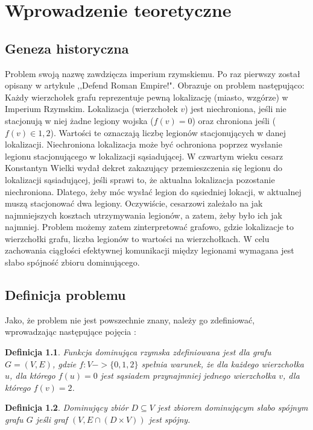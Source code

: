 \chapter{Wprowadzenie teoretyczne}

\section{Geneza historyczna}
Problem swoją nazwę zawdzięcza imperium rzymskiemu. Po raz pierwszy został opisany w artykule ,,Defend Roman Empire!".\cite{defendRomanEmpire}
Obrazuje on problem następująco: Każdy wierzchołek grafu reprezentuje pewną lokalizację (miasto, wzgórze) w Imperium Rzymskim. Lokalizacja (wierzchołek $v$) jest niechroniona, jeśli nie stacjonują w niej żadne legiony wojska ($f(v) = 0$) oraz chroniona jeśli ($f(v) \in {1,2} $). Wartości te oznaczają liczbę legionów stacjonujących w danej lokalizacji. Niechroniona lokalizacja może być ochroniona poprzez wysłanie legionu stacjonującego w lokalizacji sąsiadującej. W czwartym wieku cesarz Konstantyn Wielki wydał dekret zakazujący przemieszczenia się legionu do lokalizacji sąsiadującej, jeśli sprawi to, że aktualna lokalizacja pozostanie niechroniona. Dlatego, żeby móc wysłać legion do sąsiedniej lokacji, w aktualnej muszą stacjonować dwa legiony. Oczywiście, cesarzowi zależało na jak najmniejszych kosztach utrzymywania legionów, a zatem, żeby było ich jak najmniej. \cite{theoryWCRDF} Problem możemy zatem zinterpretować grafowo, gdzie lokalizacje to wierzchołki grafu, liczba legionów to wartości na wierzchołkach. W celu zachowania ciągłości efektywnej komunikacji między legionami wymagana jest słabo spójność zbioru dominującego.

\section{Definicja problemu}
Jako, że problem nie jest powszechnie znany, należy go zdefiniować, wprowadzając następujące pojęcia \cite{theoryWCRDF}:

\newtheorem{definition}{Definicja}

\begin{definition}
    Funkcja dominująca rzymska zdefiniowana jest dla grafu $G = (V, E)$, gdzie $f: V -> \{0,1,2\}$ spełnia warunek, że dla każdego wierzchołka $u$, dla którego $f(u) = 0$ jest sąsiadem przynajmniej jednego wierzchołka $v$, dla którego $f(v) = 2$.
\end{definition}

\begin{definition}
    Dominujący zbiór $D \subseteq V$ jest zbiorem dominującym słabo spójnym grafu $G$ jeśli graf $(V,E \cap (D \times V))$ jest spójny.
\end{definition}

